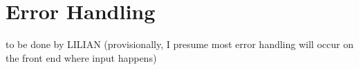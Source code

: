 \section{Error Handling}
to be done by LILIAN (provisionally, I presume most error handling will occur on the front end where input happens)\\ 
